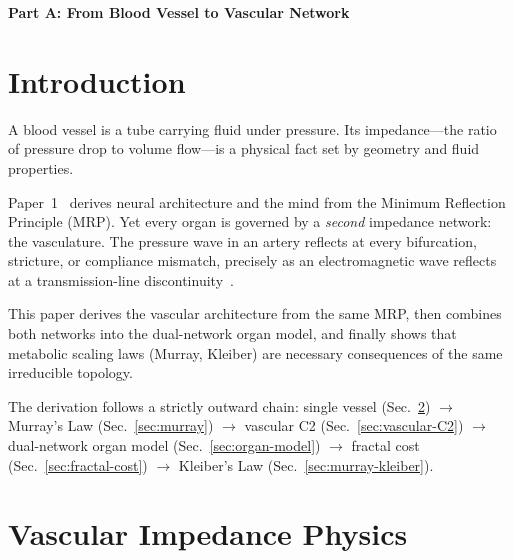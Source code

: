 \documentclass[aps,pre,twocolumn,superscriptaddress,floatfix]{revtex4-2}
\begin{document}
\maketitle



\bigskip\noindent\textbf{\large Part A: From Blood Vessel to Vascular Network}\medskip


\section{Introduction}
\label{sec:intro}

A blood vessel is a tube carrying fluid under pressure.
Its impedance---the ratio of pressure drop to volume
flow---is a physical fact set by geometry and fluid
properties.

Paper~1~\cite{Paper1} derives neural architecture and
the mind from the Minimum Reflection Principle (MRP).
Yet every organ is governed by a \emph{second} impedance
network: the vasculature.
The pressure wave in an artery reflects at every
bifurcation, stricture, or compliance mismatch,
precisely as an electromagnetic wave reflects at a
transmission-line discontinuity~\cite{nichols2011,
womersley1955}.

This paper derives the vascular architecture from the
same MRP, then combines both networks into the
dual-network organ model, and finally shows that
metabolic scaling laws (Murray, Kleiber) are necessary
consequences of the same irreducible topology.

The derivation follows a strictly outward chain:
single vessel (Sec.~\ref{sec:framework}) $\to$
Murray's Law (Sec.~\ref{sec:murray}) $\to$
vascular C2 (Sec.~\ref{sec:vascular-C2}) $\to$
dual-network organ model (Sec.~\ref{sec:organ-model})
$\to$ fractal cost (Sec.~\ref{sec:fractal-cost}) $\to$
Kleiber's Law (Sec.~\ref{sec:murray-kleiber}).


\section{Vascular Impedance Physics}
\label{sec:framework}
\end{document}
